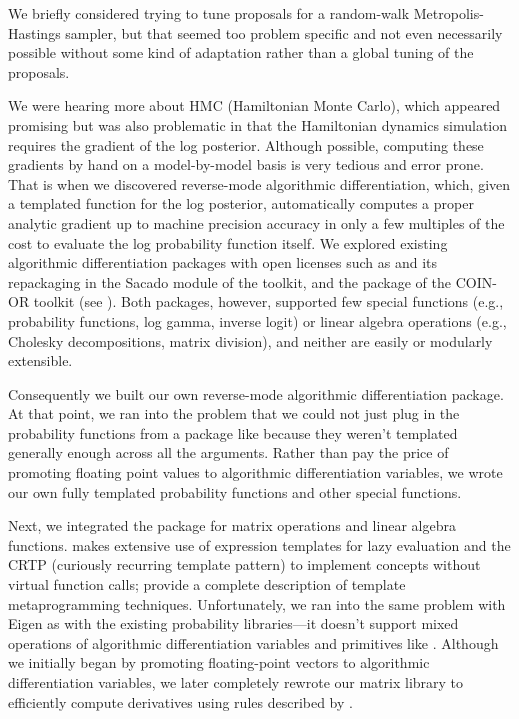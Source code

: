 \documentclass[article]{jss}
\begin{document}
We briefly considered trying to tune proposals for a random-walk
Metropolis-Hastings sampler, but that seemed too problem specific and
not even necessarily possible without some kind of adaptation rather
than a global tuning of the proposals. 

We were hearing more about HMC (Hamiltonian Monte Carlo), which
appeared promising but was also problematic in that the Hamiltonian
dynamics simulation requires the gradient of the log posterior.
Although possible, computing these gradients by hand on a model-by-model basis
is very tedious and error prone.  That is when we discovered
reverse-mode algorithmic differentiation, which, given a
templated  function for the log posterior,
automatically computes a proper analytic gradient up to machine
precision accuracy in only a few multiples of the cost to evaluate the
log probability function itself.  We explored existing algorithmic
differentiation packages with open licenses such as 
\citep{Gay:2005} and its repackaging in the Sacado module of the
 toolkit, and the  package of the COIN-OR
toolkit (see \citep{BellBurke:2008}).  Both packages, however, supported
few special functions (e.g., probability functions, log gamma,
inverse logit) or linear algebra operations (e.g., Cholesky
decompositions, matrix division), and neither are easily or modularly
extensible.

Consequently we built our own reverse-mode algorithmic differentiation package.
At that point, we ran into the problem that we could not just plug in
the probability functions from a package like  because they
weren't templated generally enough across all the arguments.  Rather
than pay the price of promoting floating point values to algorithmic
differentiation variables, we wrote our own fully templated
probability functions and other special functions.

Next, we integrated the  package  for matrix
operations and linear algebra functions.   makes extensive
use of expression templates for lazy evaluation and the CRTP
(curiously recurring template pattern) to implement concepts without
virtual function calls; \cite{VandevoordeJosuttis:2002} provide a 
complete description of template metaprogramming techniques. 
Unfortunately, we
ran into the same problem with Eigen as with the existing probability
libraries---it doesn't support mixed operations of algorithmic
differentiation variables and primitives like .  Although
we initially began by promoting floating-point vectors to algorithmic
differentiation variables, we later completely rewrote our matrix
library to efficiently compute derivatives using rules described by
\cite{Giles:2008}.
\end{document}
